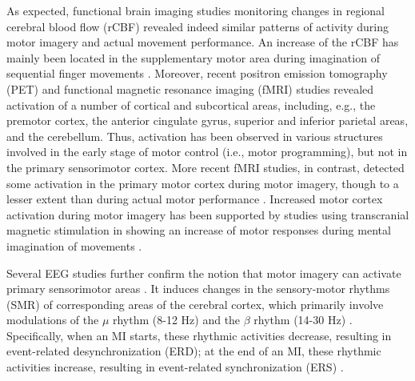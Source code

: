 \documentclass[journal,twocolumn]{IEEEtran}
\begin{document}
As expected, functional brain imaging studies monitoring changes in regional cerebral blood flow (rCBF) revealed indeed similar patterns of activity during motor imagery and actual movement performance. An increase of the rCBF has mainly been located in the supplementary motor area during imagination of sequential finger movements \cite{roland1980supplementary}. Moreover, recent positron emission tomography (PET) \cite{decety1994mapping} and functional magnetic resonance imaging (fMRI) studies \cite{rao1993functional} revealed activation of a number of cortical and subcortical areas, including, e.g., the premotor cortex, the anterior cingulate gyrus, superior and inferior parietal areas, and the cerebellum. Thus, activation has been observed in various structures involved in the early stage of motor control (i.e., motor programming), but not in the primary sensorimotor cortex. More recent fMRI studies, in contrast, detected some activation in the primary motor cortex during motor imagery, though to a lesser extent than during actual motor performance \cite{hallett1994involvement}. Increased motor cortex activation during motor imagery has been supported by studies using transcranial magnetic stimulation in showing an increase of motor responses during mental imagination of movements \cite{gandevia1987knowledge}.

Several EEG studies further confirm the notion that motor imagery can activate primary sensorimotor areas \cite{beisteiner1995mental}. It induces changes in the sensory-motor rhythms (SMR) of corresponding areas of the cerebral cortex, which primarily involve modulations of the $\mu$ rhythm (8-12 Hz) and the $\beta$ rhythm (14-30 Hz) \cite{jeannerod1995mental}. Specifically, when an MI starts, these rhythmic activities decrease, resulting in event-related desynchronization (ERD); at the end of an MI, these rhythmic activities increase, resulting in event-related synchronization (ERS) \cite{pfurtscheller1997eeg}.
\end{document}
